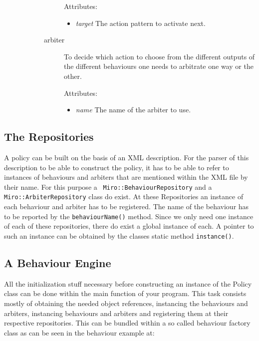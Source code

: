 \begin{description}
\begin{description}
\begin{description}
      Attributes: 
      \begin{itemize}
      \item \textit{target} The action pattern to activate next.
      \end{itemize}  

    \item[arbiter]
      To decide which action to choose from the different outputs of
      the different behaviours one needs to arbitrate one way or the other.

      Attributes: 
      \begin{itemize}
      \item \textit{name} The name of the arbiter to use.
      \end{itemize}
    \end{description}
  \end{description}
\end{description}

\subsection{The Repositories}

A policy can be built on the basis of an XML description. For the
parser of this description to be able to construct the policy, it has
to be able to refer to instances of behaviours and arbiters that are
mentioned within the XML file by their name.  For this purpose a {\tt
  Miro::BehaviourRepository} and a {\tt Miro::ArbiterRepository} class
do exist.  At these Repositories an instance of each behaviour and
arbiter has to be registered. The name of the behaviour has to be
reported by the {\tt behaviourName()} method.  Since we only need one
instance of each of these repositories, there do exist a global
instance of each. A pointer to such an instance can be obtained by
the classes static method {\tt instance()}.

\subsection{A Behaviour Engine}

All the initialization stuff necessary before constructing an instance
of the Policy class can be done within the main function of your
program. This task consists mostly of obtaining the needed object
references, instancing the behaviours and arbiters, instancing
behaviours and arbiters and registering them at their respective
repositories.  This can be bundled within a so called behaviour factory
class as can be seen in the behaviour example at:

